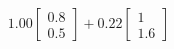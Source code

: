 \documentclass[preview]{standalone}
\begin{document}
\begin{align*}
1.00 \begin{bmatrix} 0.8 \\ 0.5 \end{bmatrix} + 0.22 \begin{bmatrix} 1 \\ 1.6 \end{bmatrix}
\end{align*}
\end{document}
